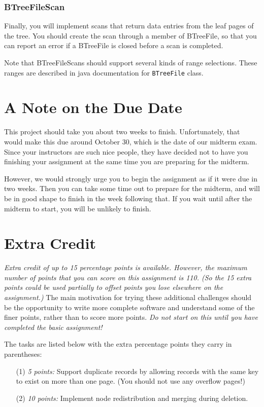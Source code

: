\subsubsection{BTreeFileScan}

Finally, you will implement scans that return data entries from
the leaf pages of the tree.
You should create the scan
through a member of BTreeFile, so that you can report an error if a BTreeFile
is closed before a scan is completed.  

Note that BTreeFileScans should support several kinds
of range selections.  These
ranges are described in java documentation for {\tt BTreeFile} class.

\section{A Note on the Due Date}

This project should take you about two weeks to finish.  Unfortunately,
that would make this due around October 30, which is the date of our
midterm exam.  Since your instructors are such nice people, they have
decided not to have you finishing your assignment at the same time
you are preparing for the midterm.

However, we would strongly urge you to begin the assignment as if
it were due in two weeks.  Then you can take some time out to prepare
for the midterm, and will be in good shape to finish in the week
following that.  If you wait until after the midterm to start, you
will be unlikely to finish.

 
\section{Extra Credit}

{\em Extra credit of up to 15 percentage points is available.
However, the maximum number of points that you can score on this
assignment is 110.  (So the 15 extra points could be used partially to offset
points you lose elsewhere on the assignment.)}
The main motivation
for trying these additional challenges should be the opportunity to write
more complete software and understand some of the finer points, rather than to
score more points.  {\em Do not start on this until you have completed
the basic assignment!}

The tasks are listed below with the extra percentage points they
carry in parentheses:

\begin{enumerate}
\item [(1)]
{\em 5 points:}  Support duplicate records by allowing records with the same key
to exist on more than one page.  (You should not use any overflow pages!)
\item [(2)]
{\em 10 points:}  Implement node redistribution and merging during deletion.
\end{enumerate}



